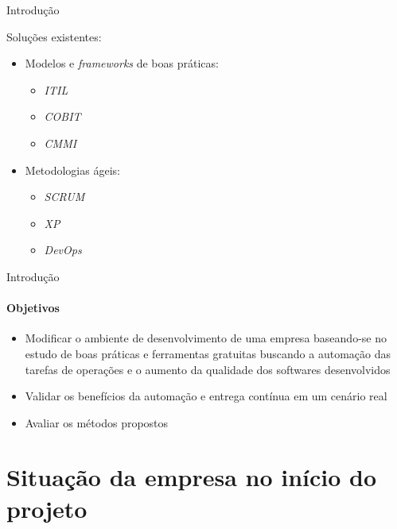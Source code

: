 \documentclass[aspectratio=169]{beamer}
\begin{document}
\begin{frame}{Introdução}
	
	Soluções existentes:
	
	\begin{itemize}
		
		\item Modelos e \textit{frameworks} de boas práticas:
		
		\begin{itemize}
			\item \textit{ITIL}
			\item \textit{COBIT} 
			\item \textit{CMMI} 
		\end{itemize}
		
		\item Metodologias ágeis:
		
		\begin{itemize}
			\item \textit{SCRUM}
			\item \textit{XP}
			\item \textit{DevOps}
		\end{itemize}
		
	\end{itemize}
	
\end{frame}

\begin{frame}{Introdução}
	
	\framesubtitle{Objetivos}
	
	\begin{itemize}
		
		\item Modificar o ambiente de desenvolvimento de uma empresa baseando-se no estudo de boas práticas e ferramentas gratuitas buscando a automação das tarefas de operações e o aumento da qualidade dos softwares desenvolvidos
		
		\item Validar os benefícios da automação e entrega contínua em um cenário real
		
		\item Avaliar os métodos propostos
		
	\end{itemize}
	
\end{frame}


\section{Situação da empresa no início do projeto}
\end{document}
